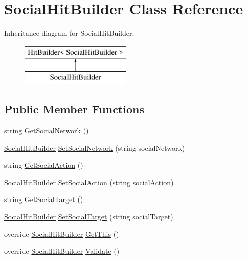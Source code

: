 \hypertarget{class_social_hit_builder}{}\section{Social\+Hit\+Builder Class Reference}
\label{class_social_hit_builder}
Inheritance diagram for Social\+Hit\+Builder\+:\begin{figure}[H]
\begin{center}
\leavevmode
\includegraphics[height=2.000000cm]{class_social_hit_builder}
\end{center}
\end{figure}
\subsection*{Public Member Functions}
\begin{DoxyCompactItemize}
\item 
string \hyperlink{class_social_hit_builder_ab5ba98bf3e8b54da88996086862dc5d1}{Get\+Social\+Network} ()
\item 
\hyperlink{class_social_hit_builder}{Social\+Hit\+Builder} \hyperlink{class_social_hit_builder_a6e435c63ac9461d06d0548b4035719b9}{Set\+Social\+Network} (string social\+Network)
\item 
string \hyperlink{class_social_hit_builder_a555cb72111f86298fbd8981e16452d9a}{Get\+Social\+Action} ()
\item 
\hyperlink{class_social_hit_builder}{Social\+Hit\+Builder} \hyperlink{class_social_hit_builder_ad19afce200693cf8279690ed1863b018}{Set\+Social\+Action} (string social\+Action)
\item 
string \hyperlink{class_social_hit_builder_a175c24bc9c8614a85ab09a10ed40b4b2}{Get\+Social\+Target} ()
\item 
\hyperlink{class_social_hit_builder}{Social\+Hit\+Builder} \hyperlink{class_social_hit_builder_a31ee440ecd51d3dc415faa5f1c59045a}{Set\+Social\+Target} (string social\+Target)
\item 
override \hyperlink{class_social_hit_builder}{Social\+Hit\+Builder} \hyperlink{class_social_hit_builder_a6c7d040e21d2c01a4d532ca4bd7d1221}{Get\+This} ()
\item 
override \hyperlink{class_social_hit_builder}{Social\+Hit\+Builder} \hyperlink{class_social_hit_builder_a55388edd43f10cc41918833aa2526a8e}{Validate} ()
\end{DoxyCompactItemize}


